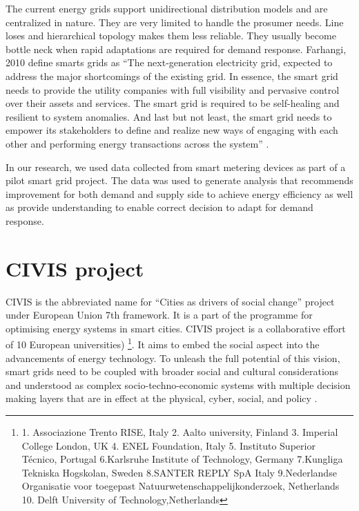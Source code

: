 The current energy grids support unidirectional distribution models and are centralized in nature.  They are very limited to handle the prosumer needs. Line loses and hierarchical topology makes them less reliable. They usually become bottle neck when rapid adaptations are required for demand response. Farhangi, 2010 define smarts grids as ``The next-generation electricity grid, expected to address the major shortcomings of the existing grid. In essence, the smart grid needs to provide the utility companies with full visibility and pervasive control over their assets and services. The smart grid is required to be self-healing and resilient to system anomalies. And last but not least, the smart grid needs to empower its stakeholders to define and realize new ways of engaging with each other and performing energy transactions across the system'' \cite{farhangi2010path}.

In our research, we used data collected from smart metering devices as part of a pilot smart grid project. The data was used to generate analysis that recommends improvement for both demand and supply side to achieve energy efficiency as well as provide understanding to enable correct decision to adapt for demand response.


\section{CIVIS project}

CIVIS is the abbreviated name for ``Cities as drivers of social change'' project under European Union 7th framework. It is a part of the programme for optimising energy systems in smart cities. CIVIS project is a collaborative effort of 10 European universities) \footnote{1. Associazione Trento RISE, Italy 2. Aalto university, Finland 3. Imperial College London, UK 4. ENEL Foundation, Italy 5. Instituto Superior Técnico, Portugal 6.Karlsruhe Institute of Technology, Germany 7.Kungliga Tekniska Hogskolan, Sweden 8.SANTER REPLY SpA Italy 9.Nederlandse Organisatie voor toegepast Natuurwetenschappelijkonderzoek, Netherlands 10. Delft University of Technology,Netherlands  }. It aims to embed the social aspect into the advancements of energy technology. To unleash the full potential of this vision, smart grids need to be coupled with broader social and cultural considerations and understood as complex socio-techno-economic systems with multiple decision making layers that are in effect at the physical, cyber, social, and policy \cite{civisproposal}.

